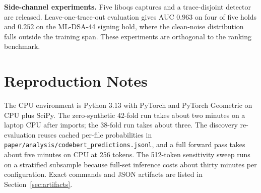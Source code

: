\documentclass[journal,10pt]{IEEEtran}
\begin{document}
\textbf{Side-channel experiments.} Five liboqs captures and a trace-disjoint detector are released.
Leave-one-trace-out evaluation gives AUC $0.963$ on four of five holds and $0.252$ on the ML-DSA-44
signing hold, where the clean-noise distribution falls outside the training span. These experiments
are orthogonal to the ranking benchmark.

\section{Reproduction Notes}
\label{app:repro}

The CPU environment is Python 3.13 with PyTorch and PyTorch Geometric on CPU plus SciPy. The
zero-synthetic 42-fold run takes about two minutes on a laptop CPU after imports; the 38-fold run
takes about three. The discovery re-evaluation reuses cached per-file probabilities in
\texttt{paper/analysis/codebert\_predictions.jsonl}, and a full forward pass takes about five minutes
on CPU at 256 tokens. The 512-token sensitivity sweep runs on a stratified subsample because
full-set inference costs about thirty minutes per configuration. Exact commands and JSON artifacts
are listed in Section~\ref{sec:artifacts}.



\end{document}
